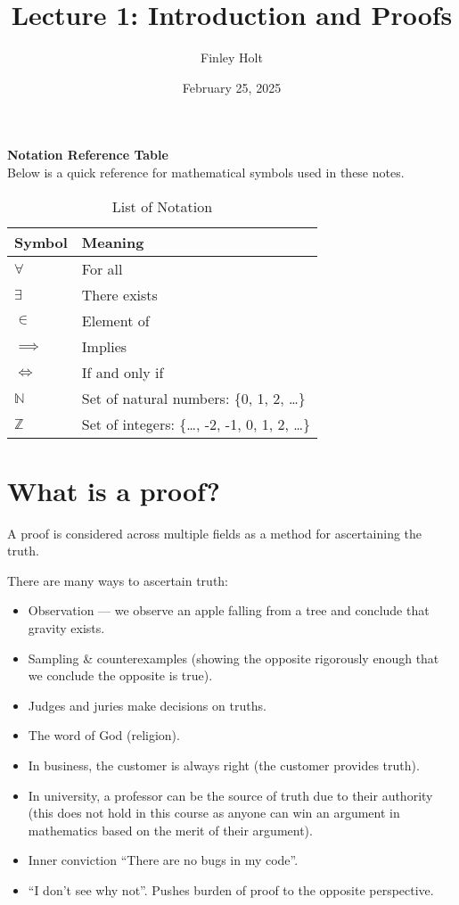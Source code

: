 \documentclass[11pt]{article}
\theoremstyle{definition}
\begin{document}
\title{Lecture 1: Introduction and Proofs}
\author{Finley Holt}
\date{February 25, 2025}
\maketitle

\noindent
\textbf{Notation Reference Table} \\
Below is a quick reference for mathematical symbols used in these notes.

\begin{table}[h!]
\centering
\begin{tabular}{ll}
\toprule
\textbf{Symbol} & \textbf{Meaning} \\
\midrule
$\forall$ & For all \\
$\exists$ & There exists \\
$\in$ & Element of \\
$\implies$ & Implies \\
$\iff$ & If and only if \\
$\mathbb{N}$ & Set of natural numbers: \{0, 1, 2, \dots\} \\
$\mathbb{Z}$ & Set of integers: \{\dots, -2, -1, 0, 1, 2, \dots\} \\
\bottomrule
\end{tabular}
\caption{List of Notation}\label{tab:notation}
\end{table}

\section{What is a proof?}

A proof is considered across multiple fields as a method for ascertaining the truth.

There are many ways to ascertain truth:
\begin{itemize}
    \item Observation --- we observe an apple falling from a tree and conclude that gravity exists.
    \item Sampling \& counterexamples (showing the opposite rigorously enough that we conclude the opposite is true).
    \item Judges and juries make decisions on truths.
    \item The word of God (religion).
    \item In business, the customer is always right (the customer provides truth).
    \item In university, a professor can be the source of truth due to their authority (this does not hold in this course as anyone can win an argument in mathematics based on the merit of their argument).
    \item Inner conviction ``There are no bugs in my code''.
    \item ``I don't see why not''. Pushes burden of proof to the opposite perspective.
\end{itemize}
\end{document}
